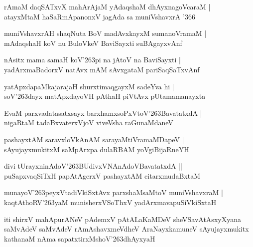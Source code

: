 \documentclass[twoside,12pt,openright]{book}
\def\S{\char'263}
\newcounter{shloka}[chapter]
\begin{document}
\begin{shloka}%
rAmaM daqSATxvX mahArAjaM yAdaqshaM dhAyxnagoVcaraM |\\
atayxMtaM  haSaRmApanonxV jagAda sa muniVshavxrA \char'366
\end{shloka}

\begin{shloka}%
muniVshavxrAH shaqNuta BoV madAvxkayxM sumanoVramaM |\\
mAdaqshaH koV nu BuloVkeV BaviSayxti suBAgayxvAnf 
\end{shloka}

\begin{shloka}%
nAsitx mama samaH koV\S pi na jAtoV na BaviSayxti |\\
yadArxmaBadorxV natAvx mAM sAvxgataM pariSaqSaTxvAnf 
\end{shloka}

\begin{shloka}%
yatApxdapaMkajarajaH shurxtimaqgayxM sadeYva hi |\\
soV\S dayx matApxdayoVH pAthaH piVtAvx pUtamamanayxta
\end{shloka}

\begin{shloka}%
EvaM parxvadatasatxsayx barxhamxsoPxVtoV\S BavatatxdA |\\
nigaRtaM tadaBxvaterxVjoV viveVsha raGunaMdaneV 
\end{shloka}

\begin{shloka}%
pashayxtAM saravxloVkAnAM sarayaMtiVramaMDapeV |\\
sAyujayxmukitxM saMpArxpa dulaRBAM yoVgiBijaRneYH
\end{shloka}

\begin{shloka}%
divi tUrayxninAdoV\S BUdivxVNAnAdoVBavatatxdA ||\\
puSapxvaqSiTxH papAtAgerxV pashayxtAM citarxmudaBxtaM 
\end{shloka}

\begin{shloka}%
munayoV\S peyxVtadiVkiSxtAvx parxshaMsaMtoV muniVshavxraM |\\
kaqtAthoRV\S yaM munisherxVSoThxV yadArxmavapuSiVkiSxtaH 
\end{shloka}

\begin{center}
iti shirxV mahApurANeV pAdemxV pAtALaKaMDeV sheVSavAtAsxyXyana saMvAdeV 
saMvAdeV rAmAshavxmeVdheV AraNayxkamuneV sAyujayxmukitx kathanaM nAma sapatxtirxMshoV\S dhAyxyaH
\end{center}
\end{document}
